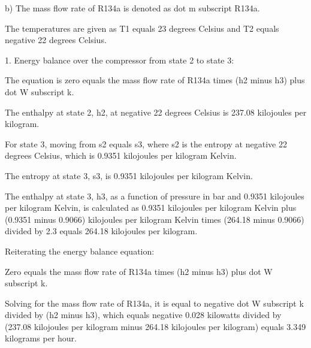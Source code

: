 b) The mass flow rate of R134a is denoted as dot m subscript R134a.

The temperatures are given as T1 equals 23 degrees Celsius and T2 equals negative 22 degrees Celsius.

1. Energy balance over the compressor from state 2 to state 3:

The equation is zero equals the mass flow rate of R134a times (h2 minus h3) plus dot W subscript k.

The enthalpy at state 2, h2, at negative 22 degrees Celsius is 237.08 kilojoules per kilogram.

For state 3, moving from s2 equals s3, where s2 is the entropy at negative 22 degrees Celsius, which is 0.9351 kilojoules per kilogram Kelvin.

The entropy at state 3, s3, is 0.9351 kilojoules per kilogram Kelvin.

The enthalpy at state 3, h3, as a function of pressure in bar and 0.9351 kilojoules per kilogram Kelvin, is calculated as 0.9351 kilojoules per kilogram Kelvin plus (0.9351 minus 0.9066) kilojoules per kilogram Kelvin times (264.18 minus 0.9066) divided by 2.3 equals 264.18 kilojoules per kilogram.

Reiterating the energy balance equation:

Zero equals the mass flow rate of R134a times (h2 minus h3) plus dot W subscript k.

Solving for the mass flow rate of R134a, it is equal to negative dot W subscript k divided by (h2 minus h3), which equals negative 0.028 kilowatts divided by (237.08 kilojoules per kilogram minus 264.18 kilojoules per kilogram) equals 3.349 kilograms per hour.